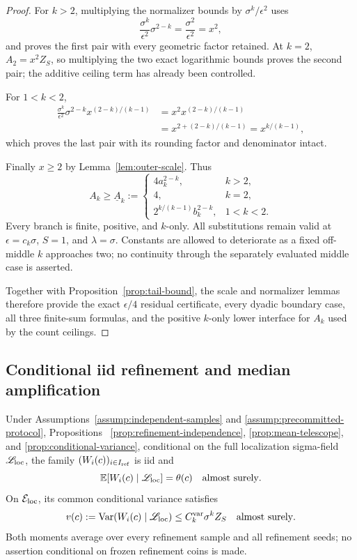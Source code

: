 \begin{proof}
For $k>2$, multiplying the normalizer bounds by
$\sigma^k/\epsilon^2$ uses
\[
 \frac{\sigma^k}{\epsilon^2}\sigma^{2-k}
 =\frac{\sigma^2}{\epsilon^2}=x^2,
\]
and proves the first pair with every geometric factor retained.  At $k=2$,
$A_2=x^2Z_S$, so multiplying the two exact logarithmic bounds proves the
second pair; the additive ceiling term has already been controlled.

For $1<k<2$,
\[
\begin{aligned}
 \frac{\sigma^k}{\epsilon^2}\sigma^{2-k}
 x^{(2-k)/(k-1)}
 &=x^2x^{(2-k)/(k-1)}\\
 &=x^{2+(2-k)/(k-1)}=x^{k/(k-1)},
\end{aligned}
\]
which proves the last pair with its rounding factor and denominator intact.

Finally $x\geq2$ by Lemma~\ref{lem:outer-scale}.  Thus
\[
 A_k\geq\underline A_k:=
 \begin{cases}
 4a_k^{2-k},&k>2,\\
 4,&k=2,\\
 2^{k/(k-1)}b_k^{2-k},&1<k<2.
 \end{cases}
\]
Every branch is finite, positive, and $k$-only.  All substitutions remain
valid at $\epsilon=c_k\sigma$, $S=1$, and $\lambda=\sigma$.  Constants are
allowed to deteriorate as a fixed off-middle $k$ approaches two; no continuity
through the separately evaluated middle case is asserted.

Together with Proposition~\ref{prop:tail-bound}, the scale and normalizer
lemmas therefore provide the exact $\epsilon/4$ residual certificate, every
dyadic boundary case, all three finite-sum formulas, and the positive
$k$-only lower interface for $A_k$ used by the count ceilings.
\end{proof}

\subsection{Conditional iid refinement and median amplification}

\begin{proposition}
\label{prop:conditional-iid}
Under Assumptions~\ref{assump:independent-samples} and
\ref{assump:precommitted-protocol}, Propositions~
\ref{prop:refinement-independence}, \ref{prop:mean-telescope}, and
\ref{prop:conditional-variance}, conditional on the full localization
sigma-field $\mathscr L_{\rm loc}$, the family
$(W_i(c))_{i\in I_{\rm ref}}$ is iid and
\[
 \mathbb E[W_i(c)\mid\mathscr L_{\rm loc}]=\theta(c)
 \quad\text{almost surely}.
\]
On $\mathcal E_{\rm loc}$, its common conditional variance satisfies
\[
 v(c):=\operatorname{Var}(W_i(c)\mid\mathscr L_{\rm loc})
 \leq C_k^{\rm var}\sigma^kZ_S
 \quad\text{almost surely}.
\]
Both moments average over every refinement sample and all refinement seeds;
no assertion conditional on frozen refinement coins is made.
\end{proposition}

